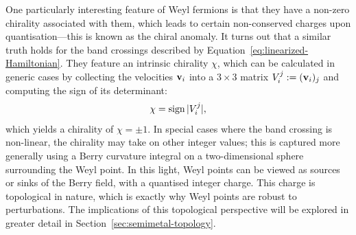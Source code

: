 One particularly interesting feature of Weyl fermions is that they have a non-zero chirality associated with them, which leads to certain non-conserved charges upon quantisation---this is known as the chiral anomaly. It turns out that a similar truth holds for the band crossings described by Equation~\eqref{eq:linearized-Hamiltonian}. They feature an intrinsic chirality $\chi$, which can be calculated in generic cases by collecting the velocities $\vb{v}_i$ into a $3\times 3$ matrix $V_i^j := (\vb{v}_i)_j$ and computing the sign of its determinant:
\begin{equation}\label{eq:determinant_chirality}
	\chi = \operatorname{sign}{|V_i^j|},
\end{equation} 
which yields a chirality of $\chi=\pm1$. In special cases where the band crossing is non-linear, the chirality may take on other integer values; this is captured more generally using a Berry curvature integral on a two-dimensional sphere surrounding the Weyl point. In this light, Weyl points can be viewed as sources or sinks of the Berry field, with a quantised integer charge. This charge is topological in nature, which is exactly why Weyl points are robust to perturbations. The implications of this topological perspective will be explored in greater detail in Section~\ref{sec:semimetal-topology}.

